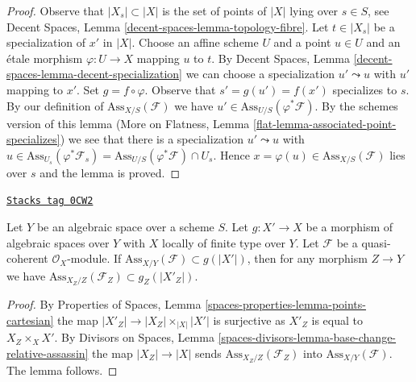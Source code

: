 \begin{proof}
Observe that $|X_s| \subset |X|$ is the set of points of $|X|$
lying over $s \in S$, see
Decent Spaces, Lemma \ref{decent-spaces-lemma-topology-fibre}.
Let $t \in |X_s|$ be a specialization of $x'$ in $|X|$.
Choose an affine scheme $U$ and a point $u \in U$ and
an \'etale morphism $\varphi : U \to X$ mapping $u$ to $t$.
By Decent Spaces, Lemma \ref{decent-spaces-lemma-decent-specialization}
we can choose a specialization $u' \leadsto u$
with $u'$ mapping to $x'$. Set $g = f \circ \varphi$.
Observe that $s' = g(u') = f(x')$ specializes to $s$.
By our definition of $\text{Ass}_{X/S}(\mathcal{F})$
we have $u' \in \text{Ass}_{U/S}(\varphi^*\mathcal{F})$.
By the schemes version of this lemma
(More on Flatness, Lemma \ref{flat-lemma-associated-point-specializes})
we see that there is a specialization $u' \leadsto u$ with
$u \in \text{Ass}_{U_s}(\varphi^*\mathcal{F}_s) =
\text{Ass}_{U/S}(\varphi^*\mathcal{F}) \cap U_s$.
Hence $x = \varphi(u) \in \text{Ass}_{X/S}(\mathcal{F})$
lies over $s$ and the lemma is proved.
\end{proof}

\begin{lemma}
\label{spaces-flat-lemma-contains-relative-ass-after-base-change}
\href{https://stacks.math.columbia.edu/tag/0CW2}{\texttt{Stacks tag 0CW2}}

Let $Y$ be an algebraic space over a scheme $S$. Let $g : X' \to X$ be a
morphism of algebraic spaces over $Y$ with $X$ locally of finite type over $Y$.
Let $\mathcal{F}$ be a quasi-coherent $\mathcal{O}_X$-module.
If $\text{Ass}_{X/Y}(\mathcal{F}) \subset g(|X'|)$, then for any morphism
$Z \to Y$ we have $\text{Ass}_{X_Z/Z}(\mathcal{F}_Z) \subset g_Z(|X'_Z|)$.
\end{lemma}

\begin{proof}
By Properties of Spaces, Lemma \ref{spaces-properties-lemma-points-cartesian}
the map $|X'_Z| \to |X_Z| \times_{|X|} |X'|$ is surjective as
$X'_Z$ is equal to $X_Z \times_X X'$.
By Divisors on Spaces, Lemma
\ref{spaces-divisors-lemma-base-change-relative-assassin}
the map $|X_Z| \to |X|$ sends $\text{Ass}_{X_Z/Z}(\mathcal{F}_Z)$
into $\text{Ass}_{X/Y}(\mathcal{F})$. The lemma follows.
\end{proof}

